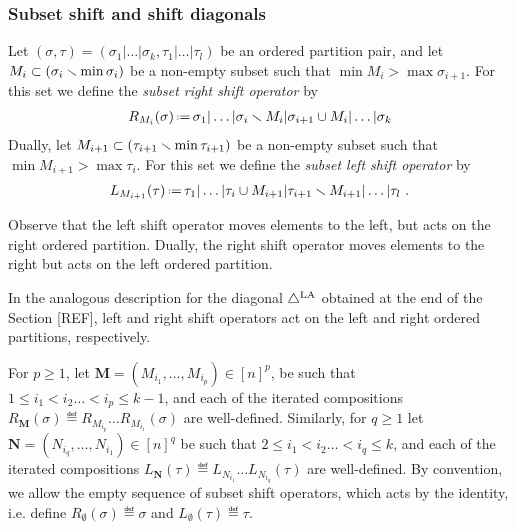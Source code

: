 
\subsubsection{Subset shift and shift diagonals}

\begin{definition}
\label{def:subset shifts}
Let $(\sigma,\tau) = (\sigma_1|\dots|\sigma_k,\tau_1|\dots|\tau_l)$ be an ordered partition pair, and let $M_i\subset (\sigma_{i} \smallsetminus \min \sigma_{i})$ be a non-empty subset such that $\min M_i> \max \sigma_{i+1}$.
For this set we define the \emph{subset right shift operator} by
\begin{align*}
    R_{M_i}(\sigma) \eqdef \sigma_1|\dots|\sigma_i \ssm M_i|\sigma_{i+1} \cup M_i|\dots|\sigma_k
\end{align*}
Dually, let $M_{i+1}\subset (\tau_{i+1}\smallsetminus \min \tau_{i+1})$  be a non-empty subset such that $\min M_{i+1}> \max \tau_{i}$.
For this set we define the \emph{subset left shift operator} by
\begin{align*}
    L_{M_{i+1}}(\tau) \eqdef \tau_1|\dots|\tau_i \cup M_{i+1}|\tau_{i+1} \ssm M_{i+1}|\dots|\tau_l \ .
\end{align*}
\end{definition}
Observe that the left shift operator moves elements to the left, but acts on the right ordered partition.
Dually, the right shift operator moves elements to the right but acts on the left ordered partition.

\begin{remark}
    In the analogous description for the diagonal $\triangle^{\mathrm{LA}}$ obtained at the end of the Section [REF], left and right shift operators act on the left and right ordered partitions, respectively. 
\end{remark}

For $p\geq 1$, let $\textbf{M} = (M_{i_1},\dots,M_{i_p}) \in [n]^{p}$, be such that $1\leq i_1 < i_2 \dots < i_p \leq k-1$, and each of the iterated compositions $R_\mathbf{M}(\sigma)  \eqdef  R_{M_{i_p}}\dots R_{M_{i_1}}(\sigma)$ are well-defined.
Similarly, for $q\geq 1$ let $\textbf{N} = (N_{i_q},\dots,N_{i_1}) \in [n]^{q}$ be such that $2\leq i_1 < i_2 \dots < i_q \leq k$, and each of the iterated compositions $L_\mathbf{N}(\tau)  \eqdef  L_{N_{i_1}}\dots L_{N_{i_q}}(\tau)$ are well-defined.
By convention, we allow the empty sequence of subset shift operators, which acts by the identity, i.e. define $R_{\mathbf{\emptyset}}(\sigma)  \eqdef  \sigma$ and $L_{\mathbf{\emptyset}} (\tau) \eqdef  \tau$.

